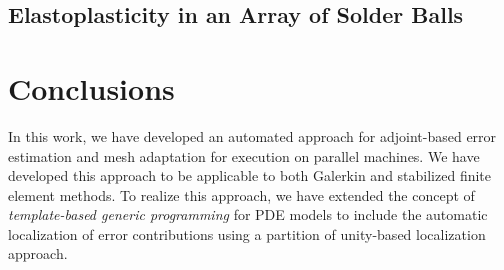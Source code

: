 \subsection{Elastoplasticity in an Array of Solder Balls}

\section{Conclusions}

In this work, we have developed an automated approach for
adjoint-based error estimation and mesh adaptation for
execution on parallel machines. We have developed this approach
to be applicable to both Galerkin and stabilized finite
element methods. To realize this approach, we have extended
the concept of \emph{template-based generic programming} for
PDE models to include the automatic localization of error
contributions using a partition of unity-based
localization approach.

